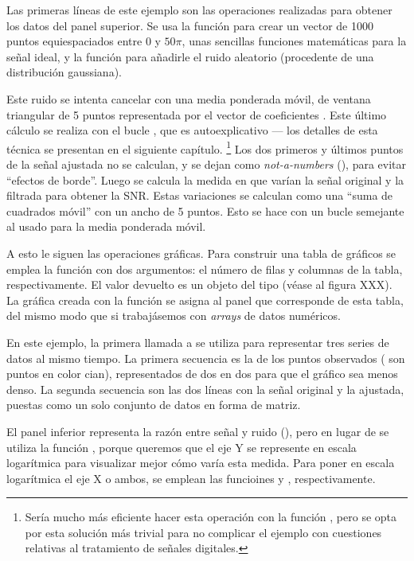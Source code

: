 ﻿\documentclass[spanish]{article}
\begin{document}
Las primeras líneas de este ejemplo son las operaciones realizadas para obtener los datos del panel superior. Se usa la función  para crear un vector de 1000 puntos equiespaciados entre $0$ y $50\pi$, unas sencillas funciones matemáticas para la señal ideal, y la función  para añadirle el ruido aleatorio (procedente de una distribución gaussiana).

Este ruido se intenta cancelar con una media ponderada móvil, de ventana triangular de 5 puntos representada por el vector de coeficientes . Este último cálculo se realiza con el bucle , que es autoexplicativo --- los detalles de esta técnica se presentan en  el siguiente capítulo.%
\footnote{%
Sería mucho más eficiente hacer esta operación con la
función , pero se opta por esta solución más trivial para no
complicar el ejemplo con cuestiones relativas al tratamiento de señales digitales.%
}
Los dos primeros y últimos puntos de la señal ajustada no se calculan, y se dejan como \emph{not-a-numbers} (), para evitar ``efectos de borde''. Luego se calcula la medida en que varían la señal original y la filtrada para obtener la SNR. Estas variaciones se calculan como una ``suma de cuadrados móvil'' con un ancho de 5 puntos. Esto se hace con un bucle semejante al usado para la media ponderada móvil.

A esto le siguen las operaciones gráficas. Para construir una tabla de gráficos se emplea la función  con dos argumentos: el número de filas y columnas de la tabla, respectivamente. El valor devuelto es un objeto del tipo  (véase al figura XXX). La gráfica creada con la función  se asigna al panel que corresponde de esta tabla, del mismo modo que si trabajásemos con \emph{arrays} de datos numéricos.

En este ejemplo, la primera llamada a  se utiliza para representar tres series de datos al mismo tiempo. La primera secuencia es la de los puntos observados ( son puntos en color cian), representados de dos en dos para que el gráfico sea menos denso. La segunda secuencia son las dos líneas con la señal original y la ajustada, puestas como un solo conjunto de datos en forma de matriz.

El panel inferior representa la razón entre señal y ruido (), pero en lugar de  se utiliza la función , porque queremos que el eje Y se represente en escala logarítmica para visualizar mejor cómo varía esta medida. Para poner en escala logarítmica el eje X o ambos, se emplean las funcioines  y , respectivamente.
\end{document}
